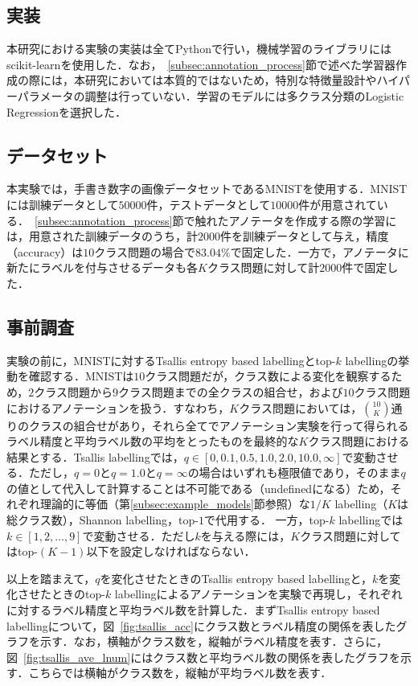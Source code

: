 \documentclass[a4paper,conference]{IEEEtran}
\begin{document}
\subsection{実装}\label{subsec:implementation}
本研究における実験の実装は全てPythonで行い，機械学習のライブラリにはscikit-learnを使用した．なお，~\ref{subsec:annotation_process}節で述べた学習器作成の際には，本研究においては本質的ではないため，特別な特徴量設計やハイパーパラメータの調整は行っていない．学習のモデルには多クラス分類のLogistic Regressionを選択した．

\subsection{データセット}\label{subsec:dataset}
本実験では，手書き数字の画像データセットであるMNISTを使用する．MNISTには訓練データとして$50000$件，テストデータとして$10000$件が用意されている．~\ref{subsec:annotation_process}節で触れたアノテータを作成する際の学習には，用意された訓練データのうち，計$2000$件を訓練データとして与え，精度（accuracy）は$10$クラス問題の場合で$83.04\%$で固定した．一方で，アノテータに新たにラベルを付与させるデータも各$K$クラス問題に対して計$2000$件で固定した．

\subsection{事前調査}\label{subsec:preliminary_exp}
実験の前に，MNISTに対するTsallis entropy based labellingとtop-$k$ labellingの挙動を確認する．MNISTは$10$クラス問題だが，クラス数による変化を観察するため，$2$クラス問題から$9$クラス問題までの全クラスの組合せ，および$10$クラス問題におけるアノテーションを扱う．すなわち，$K$クラス問題においては，$\binom{10}{K}$通りのクラスの組合せがあり，それら全てでアノテーション実験を行って得られるラベル精度と平均ラベル数の平均をとったものを最終的な$K$クラス問題における結果とする．Tsallis labellingでは，$q\in[0, 0.1, 0.5, 1.0, 2.0, 10.0, \infty]$で変動させる．ただし，$q = 0$と$q = 1.0$と$q = \infty$の場合はいずれも極限値であり，そのまま$q$の値として代入して計算することは不可能である（undefinedになる）ため，それぞれ理論的に等価（第\ref{subsec:example_models}節参照）な$1/K$ labelling（$K$は総クラス数），Shannon labelling，top-$1$で代用する．
一方，top-$k$ labellingでは$k\in[1, 2, ..., 9]$で変動させる．ただし$k$を与える際には，$K$クラス問題に対してはtop-$(K
- 1)$以下を設定しなければならない．

以上を踏まえて，$q$を変化させたときのTsallis entropy based labellingと，$k$を変化させたときのtop-$k$ labellingによるアノテーションを実験で再現し，それぞれに対するラベル精度と平均ラベル数を計算した．まずTsallis entropy based labellingについて，図~\ref{fig:tsallis_acc}にクラス数とラベル精度の関係を表したグラフを示す．なお，横軸がクラス数を，縦軸がラベル精度を表す．さらに，図~\ref{fig:tsallis_ave_lnum}にはクラス数と平均ラベル数の関係を表したグラフを示す．こちらでは横軸がクラス数を，縦軸が平均ラベル数を表す．
\end{document}
